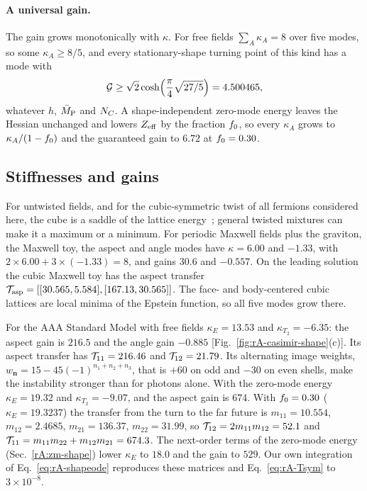 \paragraph{A universal gain.}
The gain grows monotonically with $\kappa$.
For free fields $\sum_A\kappa_A=8$ over five modes, so some $\kappa_A\geq8/5$, and every stationary-shape turning point of this kind has a mode with
\begin{equation}
\mathcal{G}\geq\sqrt2\cosh\!\Big(\frac\pi4\sqrt{27/5}\Big)=4.500465,
\end{equation} %
whatever $h$, $\bar M_{\mathrm{P}}$ and $N_C$.
A shape-independent zero-mode energy leaves the Hessian unchanged and lowers $Z_{\rm eff}$ by the fraction $f_0$, so every $\kappa_A$ grows to $\kappa_A/(1-f_0)$ and the guaranteed gain to $6.72$ at $f_0=0.30$. %

\subsection{Stiffnesses and gains}
\label{rA:sh-gains}

For untwisted fields, and for the cubic-symmetric twist of all fermions considered here, the cube is a saddle of the lattice energy~\cite{Ennola:1964epstein,Betermin:2016cubic}; general twisted mixtures can make it a maximum or a minimum.
For periodic Maxwell fields plus the graviton, the Maxwell toy, the aspect and angle modes have $\kappa=6.00$ and $-1.33$, with $2\times6.00+3\times(-1.33)=8$, and gains $30.6$ and $-0.557$. %
On the leading solution the cubic Maxwell toy has the aspect transfer $\mathcal{T}_{\rm asp}=[[30.565,5.584],[167.13,30.565]]$. %
The face- and body-centered cubic lattices are local minima of the Epstein function, so all five modes grow there.

For the AAA Standard Model with free fields $\kappa_E=13.53$ and $\kappa_{T_2}=-6.35$: the aspect gain is $216.5$ and the angle gain $-0.885$ [Fig.~\ref{fig:rA-casimir-shape}(c)]. %
Its aspect transfer has $\mathcal{T}_{11}=216.46$ and $\mathcal{T}_{12}=21.79$. %
Its alternating image weights, $w_{\bm n}=15-45(-1)^{n_1+n_2+n_3}$, that is $+60$ on odd and $-30$ on even shells, make the instability stronger than for photons alone. %
With the zero-mode energy $\kappa_E=19.32$ and $\kappa_{T_2}=-9.07$, and the aspect gain is $674$. %
With $f_0=0.30$ ($\kappa_E=19.3237$) the transfer from the turn to the far future is $m_{11}=10.554$, $m_{12}=2.4685$, $m_{21}=136.37$, $m_{22}=31.99$, so $\mathcal{T}_{12}=2m_{11}m_{12}=52.1$ and $\mathcal{T}_{11}=m_{11}m_{22}+m_{12}m_{21}=674.3$. %
The next-order terms of the zero-mode energy (Sec.~\ref{rA:zm-shape}) lower $\kappa_E$ to $18.0$ and the gain to $529$. %
Our own integration of Eq.~\eqref{eq:rA-shapeode} reproduces these matrices and Eq.~\eqref{eq:rA-Tsym} to $3\times10^{-8}$. %

